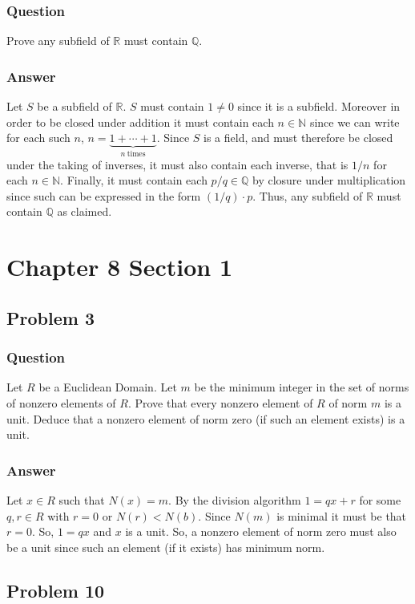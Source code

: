 \documentclass[12pt]{article}
\begin{document}
\subsubsection{Question}
Prove any subfield of $\mathbb{R}$ must contain $\mathbb{Q}$.
\subsubsection{Answer}
Let $S$ be a subfield of $\mathbb{R}$. $S$ must contain $1\neq 0 $ since it is a subfield. Moreover in order to be closed under addition it must contain each $n \in \mathbb{N}$ since we can write for each such $n$, $n = \underbrace{1+\cdots+1}_{n\mathrm{\ times}}$. Since $S$ is a field, and must therefore be closed under the taking of inverses, it must also contain each inverse, that is $1/n$ for each $n \in \mathbb{N}$. Finally, it must contain each $p/q \in \mathbb{Q}$ by closure under multiplication since such can be expressed in the form $(1/q) \cdot p$. Thus, any subfield of $\mathbb{R}$ must contain $\mathbb{Q}$ as claimed.
\section{Chapter 8 Section 1}
\subsection{Problem 3}

\subsubsection{Question}
Let $R$ be a Euclidean Domain. Let $m$ be the minimum integer in the set of norms of nonzero elements of $R$. Prove that every nonzero element of $R$ of norm $m$ is a unit. Deduce that a nonzero element of norm zero (if such an element exists) is a unit.
\subsubsection{Answer}
Let $x \in R$ such that $N(x)=m$. By the division algorithm $1 = q x + r$ for some $q,r \in R$ with $r=0$ or $N(r) < N(b)$. Since $N(m)$ is minimal it must be that $r = 0$. So, $1=q x$ and $x$ is a unit. So, a nonzero element of norm zero must also be a unit since such an element (if it exists) has minimum norm.


\subsection{Problem 10}
\end{document}
